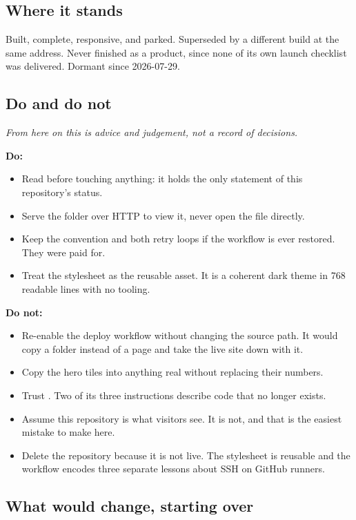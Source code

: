 \documentclass[11pt,a4paper]{article}
\begin{document}
\subsection{Where it stands}

Built, complete, responsive, and parked. Superseded by a different build at the
same address. Never finished as a product, since none of its own launch checklist
was delivered. Dormant since 2026-07-29.

\subsection{Do and do not}

\emph{From here on this is advice and judgement, not a record of decisions.}

\textbf{Do:}
\begin{itemize}
\item Read  before touching anything: it holds the only statement of
  this repository's status.
\item Serve the folder over HTTP to view it, never open the file directly.
\item Keep the \code{[deploy]} convention and both retry loops if the workflow is
  ever restored. They were paid for.
\item Treat the stylesheet as the reusable asset. It is a coherent dark theme in
  768 readable lines with no tooling.
\end{itemize}

\textbf{Do not:}
\begin{itemize}
\item Re-enable the deploy workflow without changing the  source path.
  It would copy a folder instead of a page and take the live site down with it.
\item Copy the hero tiles into anything real without replacing their numbers.
\item Trust . Two of its three instructions describe code that no
  longer exists.
\item Assume this repository is what visitors see. It is not, and that is the
  easiest mistake to make here.
\item Delete the repository because it is not live. The stylesheet is reusable and
  the workflow encodes three separate lessons about SSH on GitHub runners.
\end{itemize}

\subsection{What would change, starting over}
\end{document}
